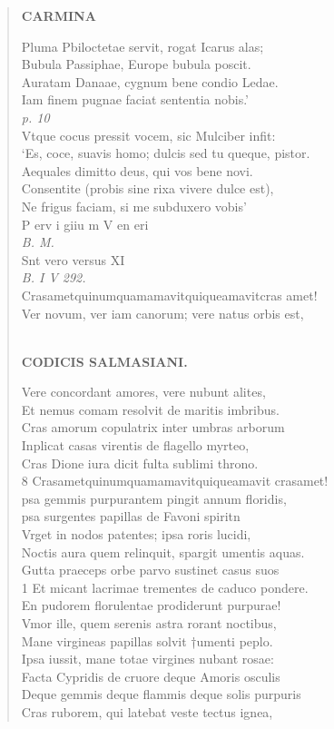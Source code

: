 \documentclass[11pt, a4paper]{report}
\begin{document}
\begin{verse}
    \begin{center} \textbf{CARMINA} \end{center} \marginpar{[170]} Pluma Pbiloctetae servit, rogat Icarus alas; \\ Bubula Passiphae, Europe bubula poscit. \\ Auratam Danaae, cygnum bene condio Ledae. \\ Iam finem pugnae faciat sententia nobis.’ \\ \textit{p. 10} \\ Vtque cocus pressit vocem, sic Mulciber infit: \\ ‘Es, coce, suavis homo; dulcis sed tu queque, pistor. \\ Aequales dimitto deus, qui vos bene novi. \\ Consentite (probis sine rixa vivere dulce est), \\ Ne frigus faciam, si me subduxero vobis’ \\ P erv i giiu m V en eri \\ \textit{B. M.} \\ Snt vero versus XI \\ \textit{B. I V 292.} \\ Crasametquinumquamamavitquiqueamavitcras amet! \\ Ver novum, ver iam canorum; vere natus orbis est, \\ 
        ﻿\pagebreak 
    \begin{center} \textbf{CODICIS SALMASIANI.} \end{center}Vere concordant amores, vere nubunt alites, \\ Et nemus comam resolvit de maritis imbribus. \\ Cras amorum copulatrix inter umbras arborum \\ Inplicat casas virentis de flagello myrteo, \\ Cras Dione iura dicit fulta sublimi throno. \\ 8 Crasametquinumquamamavitquiqueamavit crasamet! \\ psa gemmis purpurantem pingit annum floridis, \\ psa surgentes papillas de Favoni spiritn \\ Vrget in nodos patentes; ipsa roris lucidi, \\ Noctis aura quem relinquit, spargit umentis aquas. \\ Gutta praeceps orbe parvo sustinet casus suos \\ 1 Et micant lacrimae trementes de caduco pondere. \\ En pudorem florulentae prodiderunt purpurae! \\ Vmor ille, quem serenis astra rorant noctibus, \\ Mane virgineas papillas solvit †umenti peplo. \\ Ipsa iussit, mane totae virgines nubant rosae: \\ Facta Cypridis de cruore deque Amoris osculis \\ Deque gemmis deque flammis deque solis purpuris \\ Cras ruborem, qui latebat veste tectus ignea, \\ 

\end{verse}
\end{document}
